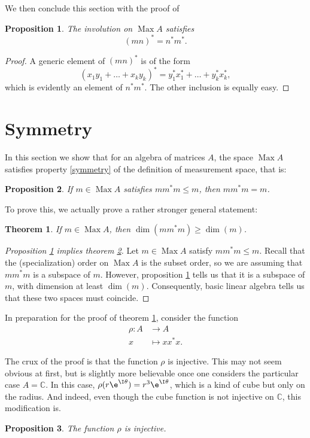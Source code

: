 \documentclass{article}
\theoremstyle{plain}
\newtheorem{theorem}{Theorem}
\newtheorem{prop}{Proposition}
\theoremstyle{nonumberplain}
\newtheorem{proof}{Proof}
\DeclareMathOperator{\Max}{Max}
\newcommand{\C}{\mathbb{C}}
\begin{document}
We then conclude this section with the proof of
\begin{prop}
The involution on $\Max A$ satisfies
\[ (mn)^* = n^* m^*.\]
\end{prop}

\begin{proof}
A generic element of $(mn)^*$ is of the form
\[(x_1 y_1 + \dots + x_k y_k)^* = y_1^* x_1^* + \dots + y_k^* x_k^*,\]
which is evidently an element of $n^* m^*$. The other inclusion is equally easy.
\end{proof}

\section{Symmetry}

In this section we show that for an algebra of matrices $A$, the space $\Max A$ satisfies property \ref{symmetry} of the definition of measurement space, that is:
\begin{prop}\label{propsymmetry}
If $m \in \Max A$ satisfies $m m^* m \leq m$, then $m m^* m = m$.
\end{prop}

To prove this, we actually prove a rather stronger general statement:

\begin{theorem}\label{propstrongsymmetry}
If $m \in \Max A$, then $\dim(m m^* m) \geq \dim(m)$.
\end{theorem}

\begin{proof}[Proposition \ref{propstrongsymmetry} implies theorem \ref{propsymmetry}]
Let $m \in \Max A$ satisfy $m m^* m \leq m$. Recall that the (specialization) order on $\Max A$ is the subset order, so we are assuming that $m m^* m$ is a subspace of $m$. However, proposition \ref{propstrongsymmetry} tells us that it is a subspace of $m$, with dimension at least $\dim(m)$. Consequently, basic linear algebra tells us that these two spaces must coincide.
\end{proof}

In preparation for the proof of theorem \ref{propstrongsymmetry}, consider the function
\begin{align*}
\rho \colon A &\to A\\
x &\mapsto x x^* x.
\end{align*}

The crux of the proof is that the function $\rho$ is injective. This may not seem obvious at first, but is slightly more believable once one considers the particular case $A = \C$. In this case, $\rho(r \e^{\I \theta}) = r^3 \e^{\I \theta}$, which is a kind of cube but only on the radius. And indeed, even though the cube function is not injective on $\C$, this modification is.

\begin{prop}
The function $\rho$ is injective.
\end{prop}

\nocite{measurement}

{}

\end{document}
